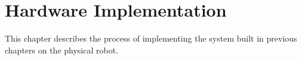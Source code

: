 \chapter{Hardware Implementation} \label{chap:hardware}
This chapter describes the process of implementing the system built in previous chapters on the physical robot.